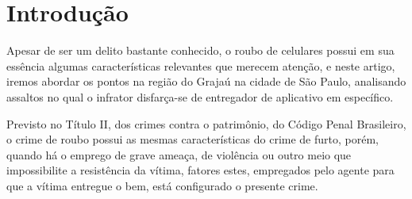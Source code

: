 \section{Introdução}

Apesar de ser um delito bastante conhecido, o roubo de celulares possui em sua 
essência algumas características relevantes que merecem atenção, e neste artigo,
iremos abordar os pontos na região do Grajaú na cidade de São Paulo, analisando
assaltos no qual o infrator disfarça-se de entregador de aplicativo em específico.

Previsto no Título II, dos crimes contra o patrimônio, do Código Penal Brasileiro,
o crime de roubo possui as mesmas características do crime de furto, porém, quando 
há o emprego de grave ameaça, de violência ou outro meio que impossibilite a 
resistência da vítima, fatores estes, empregados pelo agente para que a vítima 
entregue o bem, está configurado o presente crime.